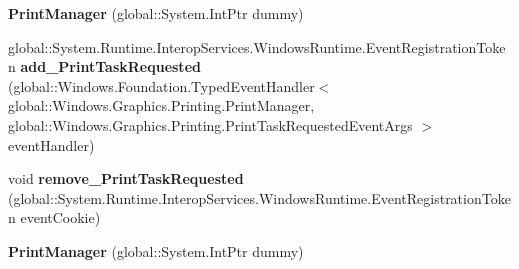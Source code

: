 \begin{DoxyCompactItemize}
\item 
\mbox{\label{class_windows_1_1_graphics_1_1_printing_1_1_print_manager_ac3534eb55e14156385c81406eb48acd4}} 
{\bfseries Print\+Manager} (global\+::\+System.\+Int\+Ptr dummy)
\item 
\mbox{\label{class_windows_1_1_graphics_1_1_printing_1_1_print_manager_ad4f9319fbeb60847591b14fbe244a321}} 
global\+::\+System.\+Runtime.\+Interop\+Services.\+Windows\+Runtime.\+Event\+Registration\+Token {\bfseries add\+\_\+\+Print\+Task\+Requested} (global\+::\+Windows.\+Foundation.\+Typed\+Event\+Handler$<$ global\+::\+Windows.\+Graphics.\+Printing.\+Print\+Manager, global\+::\+Windows.\+Graphics.\+Printing.\+Print\+Task\+Requested\+Event\+Args $>$ event\+Handler)
\item 
\mbox{\label{class_windows_1_1_graphics_1_1_printing_1_1_print_manager_af794d7bfcf46b47b3e0cfaf0e7d3e154}} 
void {\bfseries remove\+\_\+\+Print\+Task\+Requested} (global\+::\+System.\+Runtime.\+Interop\+Services.\+Windows\+Runtime.\+Event\+Registration\+Token event\+Cookie)
\item 
\mbox{\label{class_windows_1_1_graphics_1_1_printing_1_1_print_manager_ac3534eb55e14156385c81406eb48acd4}} 
{\bfseries Print\+Manager} (global\+::\+System.\+Int\+Ptr dummy)
\end{DoxyCompactItemize}
